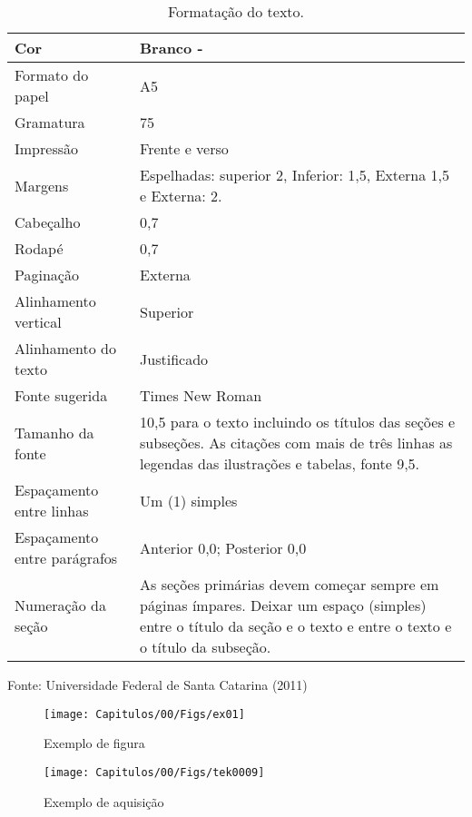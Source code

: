 \begin{table}[!htb]
	\begin{center}
		\caption{Formatação do texto. \showfont}
		\label{tab:a}
		\begin{tabular}{ p{3cm} | p{6cm} }
			\hline
			Cor & Branco - \showfont\\ \hline
			Formato do papel & A5\\ \hline
			Gramatura & 75\\ \hline
			Impressão & Frente e verso\\ \hline
			Margens & Espelhadas: superior 2, Inferior: 1,5, Externa 1,5 e Externa: 2.\\ \hline
			Cabeçalho & 0,7\\ \hline
			Rodapé & 0,7\\ \hline
			Paginação & Externa\\ \hline
			Alinhamento vertical & Superior\\ \hline
			Alinhamento do texto & Justificado\\ \hline
			Fonte sugerida & Times New Roman \\ \hline
			Tamanho da fonte & 10,5 para o texto incluindo os títulos das seções e subseções. As citações com mais de três linhas as legendas das ilustrações e tabelas, fonte 9,5.\\ \hline
			Espaçamento entre linhas & Um (1) simples\\ \hline
			Espaçamento entre parágrafos & Anterior 0,0; Posterior 0,0\\ \hline
			Numeração da seção & As seções  primárias devem  começar  sempre em páginas ímpares. Deixar um espaço (simples) entre o título da seção e o texto e  entre o texto e o título da subseção. \\  \hline
		\end{tabular}
	\end{center}
	Fonte: Universidade Federal de Santa Catarina (2011) \showfont
\end{table}


\begin{figure}
\centering
\texttt{[image: Capitulos/00/Figs/ex01]}
\caption{Exemplo de figura}
\label{fig:ex01}
\end{figure}

\begin{figure}
\centering
\texttt{[image: Capitulos/00/Figs/tek0009]}
\caption{Exemplo de aquisição}
\label{fig:tek0009}
\end{figure}






